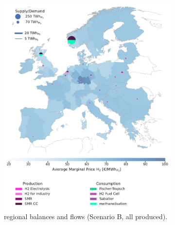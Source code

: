 \documentclass[final,5p,times,twocolumn]{elsarticle}
\begin{document}
\begin{figure}[!htbp]
  \begin{subfigure}[t]{0.47\textwidth}
      \vspace{0pt}
      \includegraphics[width=\textwidth]{balance_map_h2_scenario_b}
      \vspace{0.3cm}
      \vspace{-0.3cm}
      \caption{ regional balances and flows (Scenario B, all  produced).}
      \label{fig:balance_map_h2_scenario_b}
  \end{subfigure}
  \hfill
  \begin{subfigure}[t]{0.47\textwidth}
      \vspace{0pt}

\end{subfigure}
\end{figure}
\end{document}
